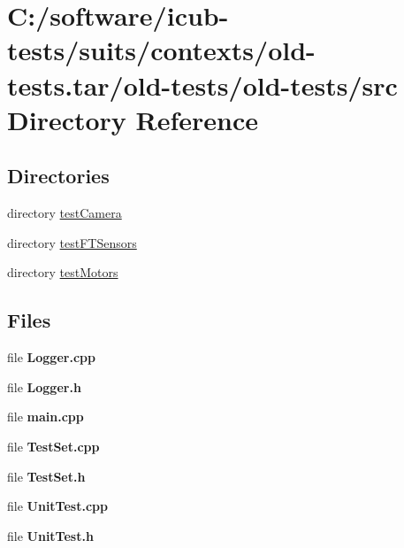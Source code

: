 \section{C\+:/software/icub-\/tests/suits/contexts/old-\/tests.tar/old-\/tests/old-\/tests/src Directory Reference}
\label{dir_490185706ad5d2aa135c9c014404c2f8}
\subsection*{Directories}
\begin{DoxyCompactItemize}
\item 
directory \hyperlink{dir_01616473d5fc48f74f82fbd79bd97b52}{test\+Camera}
\item 
directory \hyperlink{dir_fa9aec0bbe5326cfdb1382d1db732b31}{test\+F\+T\+Sensors}
\item 
directory \hyperlink{dir_10df2b1723d2e3704de34242e0f806ce}{test\+Motors}
\end{DoxyCompactItemize}
\subsection*{Files}
\begin{DoxyCompactItemize}
\item 
file {\bfseries Logger.\+cpp}
\item 
file {\bfseries Logger.\+h}
\item 
file {\bfseries main.\+cpp}
\item 
file {\bfseries Test\+Set.\+cpp}
\item 
file {\bfseries Test\+Set.\+h}
\item 
file {\bfseries Unit\+Test.\+cpp}
\item 
file {\bfseries Unit\+Test.\+h}
\end{DoxyCompactItemize}
